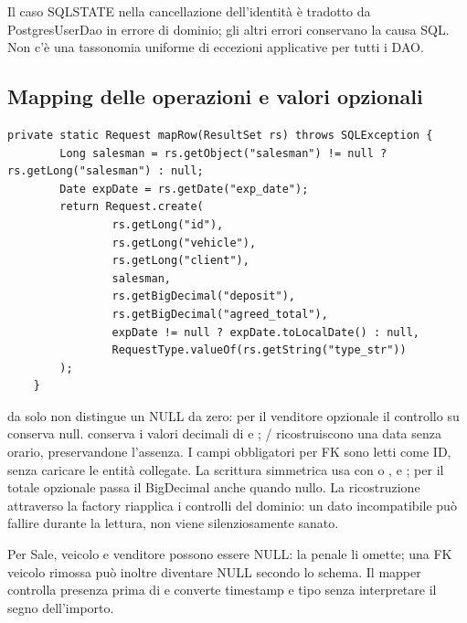 Il caso SQLSTATE  nella cancellazione dell'identità è tradotto
da PostgresUserDao in errore di dominio; gli altri errori conservano la
causa SQL. Non c'è una tassonomia uniforme di eccezioni applicative per
tutti i DAO.

\subsection{Mapping delle operazioni e valori opzionali}
\noindent\begin{minipage}{\linewidth}
\begin{lstlisting}[firstnumber=214,caption={\code{PostgresRequestDao.java}: NULL preservati e factory anche in lettura.},
  label=lst:mapping]
    private static Request mapRow(ResultSet rs) throws SQLException {
        Long salesman = rs.getObject("salesman") != null ? rs.getLong("salesman") : null;
        Date expDate = rs.getDate("exp_date");
        return Request.create(
                rs.getLong("id"),
                rs.getLong("vehicle"),
                rs.getLong("client"),
                salesman,
                rs.getBigDecimal("deposit"),
                rs.getBigDecimal("agreed_total"),
                expDate != null ? expDate.toLocalDate() : null,
                RequestType.valueOf(rs.getString("type_str"))
        );
    }
\end{lstlisting}
\end{minipage}


 da solo non distingue un NULL da zero: per il venditore
opzionale il controllo su  conserva null.
 conserva i valori decimali di  e
; / ricostruiscono
una data senza orario, preservandone l'assenza. I campi obbligatori per FK
sono letti come ID, senza caricare le entità collegate.
La scrittura simmetrica usa  con  o
,  e ; per il
totale opzionale passa il BigDecimal anche quando nullo. La ricostruzione
attraverso la factory riapplica i controlli del dominio: un dato incompatibile
può fallire durante la lettura, non viene silenziosamente sanato.

Per Sale, veicolo e venditore possono essere NULL: la penale li omette;
una FK veicolo rimossa può inoltre diventare NULL secondo lo schema.
Il mapper controlla presenza prima di  e converte timestamp
e tipo senza interpretare il segno dell'importo.


